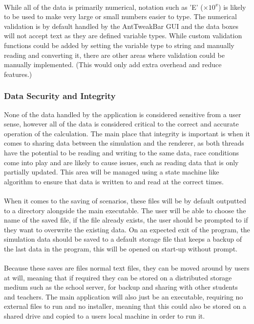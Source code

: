 \paragraph{}
While all of the data is primarily numerical, notation such as 'E' ($\times10^x$) is likely to be used to make very large or small numbers easier to type. The numerical validation is by default handled by the AntTweakBar GUI and the data boxes will not accept text as they are defined variable types. While custom validation functions could be added by setting the variable type to string and manually reading and converting it, there are other areas where validation could be manually implemented. (This would only add extra overhead and reduce features.)

\subsubsection{Data Security and Integrity}
None of the data handled by the application is considered sensitive from a user sense, however all of the data is considered critical to the correct and accurate operation of the calculation. The main place that integrity is important is when it comes to sharing data between the simulation and the renderer, as both threads have the potential to be reading and writing to the same data, race conditions come into play and are likely to cause issues, such as reading data that is only partially updated. This area will be managed using a state machine like algorithm to ensure that data is written to and read at the correct times.

\paragraph{}
When it comes to the saving of scenarios, these files will be by default outputted to a directory alongside the main executable. The user will be able to choose the name of the saved file, if the file already exists, the user should be prompted to if they want to overwrite the existing data. On an expected exit of the program, the simulation data should be saved to a default storage file that keeps a backup of the last data in the program, this will be opened on start-up without prompt.

\paragraph{}
Because these saves are files normal text files, they can be moved around by users at will, meaning that if required they can be stored on a distributed storage medium such as the school server, for backup and sharing with other students and teachers. The main application will also just be an executable, requiring no external files to run and no installer, meaning that this could also be stored on a shared drive and copied to a users local machine in order to run it.

